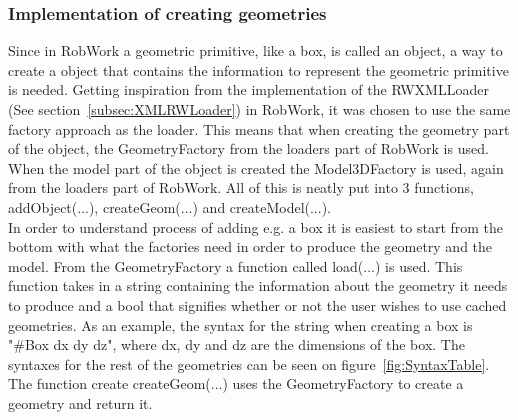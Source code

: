 \subsubsection{Implementation of creating geometries}
Since in RobWork a geometric primitive, like a box, is called an object, a way to create a object that contains the information to represent the geometric primitive is needed. Getting inspiration from the implementation of the RWXMLLoader (See section~\ref{subsec:XMLRWLoader}) in RobWork, it was chosen to use the same factory approach as the loader. This means that when creating the geometry part of the object, the GeometryFactory from the loaders part of RobWork is used. When the model part of the object is created the Model3DFactory is used, again from the loaders part of RobWork. All of this is neatly put into 3 functions, addObject(...), createGeom(...) and createModel(...).\\

In order to understand process of adding e.g. a box it is easiest to start from the bottom with what the factories need in order to produce the geometry and the model. From the GeometryFactory a function called load(...) is used. This function takes in a string containing the information about the geometry it needs to produce and a bool that signifies whether or not the user wishes to use cached geometries. As an example, the syntax for the string when creating a box is "\#Box dx dy dz", where dx, dy and dz are the dimensions of the box. The syntaxes for the rest of the geometries can be seen on figure~\ref{fig:SyntaxTable}. The function create createGeom(...) uses the GeometryFactory to create a geometry and return it.\\

